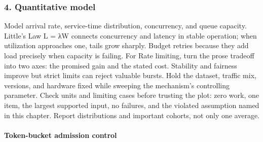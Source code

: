 \subsubsection*{4. Quantitative model}
Model arrival rate, service-time distribution, concurrency, and queue capacity. Little's Law L = λW connects concurrency and latency in stable operation; when utilization approaches one, tails grow sharply. Budget retries because they add load precisely when capacity is failing.
For Rate limiting, turn the prose tradeoff into two axes: the promised gain and the stated cost. Stability and fairness improve but strict limits can reject valuable bursts. Hold the dataset, traffic mix, versions, and hardware fixed while sweeping the mechanism's controlling parameter.
Check units and limiting cases before trusting the plot: zero work, one item, the largest supported input, no failures, and the violated assumption named in this chapter. Report distributions and important cohorts, not only one average.
\paragraph{Token-bucket admission control}
